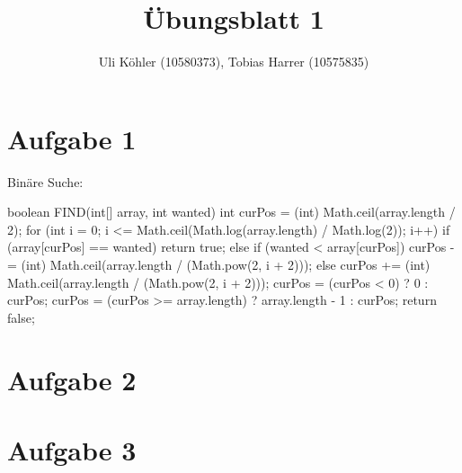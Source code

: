\documentclass[a4paper,10pt]{article}
\title{Übungsblatt 1}
\author{Uli Köhler (10580373), Tobias Harrer (10575835)}
\begin{document}
\maketitle

\section{Aufgabe 1}
Binäre Suche:\newline

boolean FIND(int[] array, int wanted) {
        int curPos = (int) Math.ceil(array.length / 2);
        for (int i = 0; i <= Math.ceil(Math.log(array.length) / Math.log(2)); i++) {
            if (array[curPos] == wanted) {
                return true;
            } else if (wanted < array[curPos]) {
                curPos -= (int) Math.ceil(array.length / (Math.pow(2, i + 2)));
            } else {
                curPos += (int) Math.ceil(array.length / (Math.pow(2, i + 2)));
            }
            curPos = (curPos < 0) ? 0 : curPos;
            curPos = (curPos >= array.length) ? array.length - 1 : curPos;
        }
        return false;
    }

\section{Aufgabe 2}


\section{Aufgabe 3}
\end{document}

